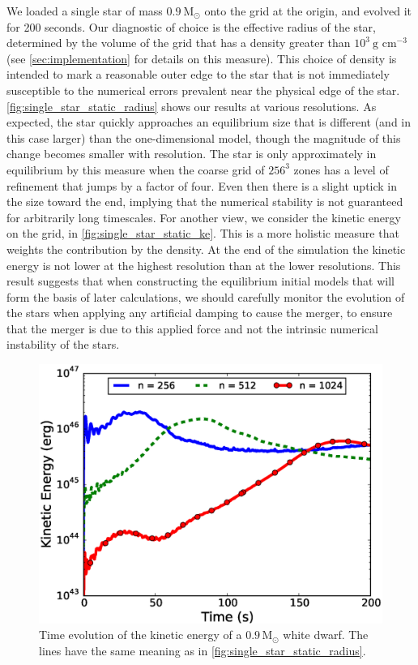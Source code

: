 \documentclass[iop,numberedappendix]{../emulateapj}
\newcommand{\msolar}{\mathrm{M}_\odot}
\begin{document}
We loaded a single star of mass $0.9\ \msolar$ onto the grid at the
origin, and evolved it for 200 seconds. Our diagnostic of choice is
the effective radius of the star, determined by the volume of the grid
that has a density greater than $10^3\ \text{g cm}^{-3}$ (see
\autoref{sec:implementation} for details on this measure). This choice
of density is intended to mark a reasonable outer edge to the star
that is not immediately susceptible to the numerical errors prevalent
near the physical edge of the star.
\autoref{fig:single_star_static_radius} shows our results at various
resolutions.  As expected, the star quickly approaches an equilibrium
size that is different (and in this case larger) than the
one-dimensional model, though the magnitude of this change becomes
smaller with resolution. The star is only approximately in equilibrium 
by this measure when the coarse grid of $256^3$ zones has a level of 
refinement that jumps by a factor of four. Even then there is a slight uptick
in the size toward the end, implying that the numerical stability is
not guaranteed for arbitrarily long timescales. For another view, we 
consider the kinetic energy on the grid, in \autoref{fig:single_star_static_ke}. 
This is a more holistic measure that weights the contribution by the density. 
At the end of the simulation the kinetic energy is not lower at the highest 
resolution than at the lower resolutions. This result suggests
that when constructing the equilibrium initial models that will form the
basis of later calculations, we should carefully monitor the evolution
of the stars when applying any artificial damping to cause the
merger, to ensure that the merger is due to this applied force and not
the intrinsic numerical instability of the stars.
\begin{figure}
  \centering
  \includegraphics[scale=0.45]{plots/single_star_static_ke}
  \caption{Time evolution of the kinetic energy of a $0.9\, \msolar$ 
    white dwarf. The lines have the same meaning as in \autoref{fig:single_star_static_radius}.
    \label{fig:single_star_static_ke}}
\end{figure}
\end{document}
